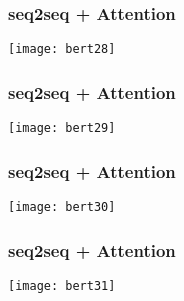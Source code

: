 




\begin{frame}[fragile]\frametitle{seq2seq + Attention}

\begin{center}
\texttt{[image: bert28]}
\end{center}	

\end{frame}

\begin{frame}[fragile]\frametitle{seq2seq + Attention}

\begin{center}
\texttt{[image: bert29]}
\end{center}	

\end{frame}

\begin{frame}[fragile]\frametitle{seq2seq + Attention}

\begin{center}
\texttt{[image: bert30]}
\end{center}	

\end{frame}

\begin{frame}[fragile]\frametitle{seq2seq + Attention}

\begin{center}
\texttt{[image: bert31]}
\end{center}	

\end{frame}


